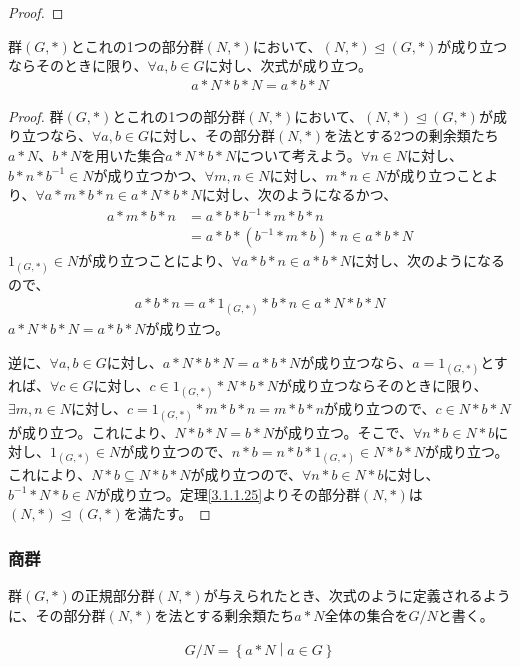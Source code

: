 \documentclass[dvipdfmx]{jsarticle}
\begin{document}
\begin{dfn}
\begin{proof}
\end{proof}
\begin{thm}\label{3.1.1.29}
群$(G,*)$とこれの1つの部分群$(N,*)$において、$(N,*) \trianglelefteq (G,*)$が成り立つならそのときに限り、$\forall a,b \in G$に対し、次式が成り立つ。
\begin{align*}
a*N*b*N = a*b*N
\end{align*}
\end{thm}
\begin{proof}
群$(G,*)$とこれの1つの部分群$(N,*)$において、$(N,*) \trianglelefteq (G,*)$が成り立つなら、$\forall a,b \in G$に対し、その部分群$(N,*)$を法とする2つの剰余類たち$a*N$、$b*N$を用いた集合$a*N*b*N$について考えよう。$\forall n \in N$に対し、$b*n*b^{- 1} \in N$が成り立つかつ、$\forall m,n \in N$に対し、$m*n \in N$が成り立つことより、$\forall a*m*b*n \in a*N*b*N$に対し、次のようになるかつ、
\begin{align*}
a*m*b*n &= a*b*b^{- 1}*m*b*n\\
&= a*b*\left( b^{- 1}*m*b \right)*n \in a*b*N
\end{align*}
$1_{(G,*)} \in N$が成り立つことにより、$\forall a*b*n \in a*b*N$に対し、次のようになるので、
\begin{align*}
a*b*n = a*1_{(G,*)}*b*n \in a*N*b*N
\end{align*}
$a*N*b*N = a*b*N$が成り立つ。\par
逆に、$\forall a,b \in G$に対し、$a*N*b*N = a*b*N$が成り立つなら、$a = 1_{(G,*)}$とすれば、$\forall c \in G$に対し、$c \in 1_{(G,*)}*N*b*N$が成り立つならそのときに限り、$\exists m,n \in N$に対し、$c = 1_{(G,*)}*m*b*n = m*b*n$が成り立つので、$c \in N*b*N$が成り立つ。これにより、$N*b*N = b*N$が成り立つ。そこで、$\forall n*b \in N*b$に対し、$1_{(G,*)} \in N$が成り立つので、$n*b = n*b*1_{(G,*)} \in N*b*N$が成り立つ。これにより、$N*b \subseteq N*b*N$が成り立つので、$\forall n*b \in N*b$に対し、$b^{- 1}*N*b \in N$が成り立つ。定理\ref{3.1.1.25}よりその部分群$(N,*)$は$(N,*) \trianglelefteq (G,*)$を満たす。
\end{proof}
\subsubsection{商群}%
\begin{dfn}
群$(G,*)$の正規部分群$(N,*)$が与えられたとき、次式のように定義されるように、その部分群$(N,*)$を法とする剰余類たち$a*N$全体の集合を$G/N$と書く。
\end{dfn}
\begin{align*}
{G}/{N} = \left\{ a*N \middle| a \in G \right\}
\end{align*}
\end{dfn}
\end{document}
